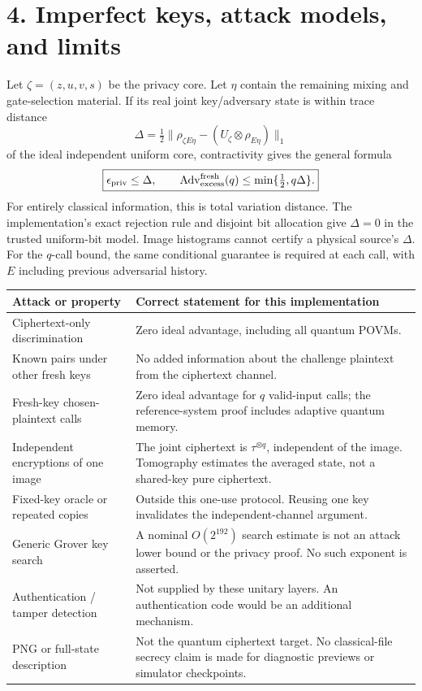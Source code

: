 \documentclass[11pt,a4paper]{article}
\begin{document}
\newpage
\section*{4. Imperfect keys, attack models, and limits}
Let \(\zeta=(z,u,v,s)\) be the privacy core. Let \(\eta\) contain the remaining mixing and gate-selection material. If its real joint key/adversary state is within trace distance
\[
\Delta=\tfrac12\|\rho_{\zeta E\eta}
 -(U_\zeta\otimes\rho_{E\eta})\|_1
\]
of the ideal independent uniform core, contractivity gives the general formula
\[
\boxed{\epsilon_{\rm priv}\le\Delta,\qquad
\operatorname{Adv}_{\rm excess}^{\rm fresh}(q)
\le\min\{\tfrac12,q\Delta\}.}
\]
For entirely classical information, this is total variation distance. The implementation's exact rejection rule and disjoint bit allocation give \(\Delta=0\) in the trusted uniform-bit model. Image histograms cannot certify a physical source's \(\Delta\).
For the \(q\)-call bound, the same conditional guarantee is required at each call, with \(E\) including previous adversarial history.

\begin{tabularx}{\linewidth}{@{}p{34mm}Y@{}}
\toprule
Attack or property&Correct statement for this implementation\\
\midrule
Ciphertext-only discrimination&Zero ideal advantage, including all quantum POVMs.\\[4pt]
Known pairs under other fresh keys&No added information about the challenge plaintext from the ciphertext channel.\\[4pt]
Fresh-key chosen-plaintext calls&Zero ideal advantage for \(q\) valid-input calls; the reference-system proof includes adaptive quantum memory.\\[4pt]
Independent encryptions of one image&The joint ciphertext is \(\tau^{\otimes q}\), independent of the image. Tomography estimates the averaged state, not a shared-key pure ciphertext.\\[4pt]
Fixed-key oracle or repeated copies&Outside this one-use protocol. Reusing one key invalidates the independent-channel argument.\\[4pt]
Generic Grover key search&A nominal \(O(2^{192})\) search estimate is not an attack lower bound or the privacy proof. No such exponent is asserted.\\[4pt]
Authentication / tamper detection&Not supplied by these unitary layers. An authentication code would be an additional mechanism.\\[4pt]
PNG or full-state description&Not the quantum ciphertext target. No classical-file secrecy claim is made for diagnostic previews or simulator checkpoints.\\
\bottomrule
\end{tabularx}
\end{document}
